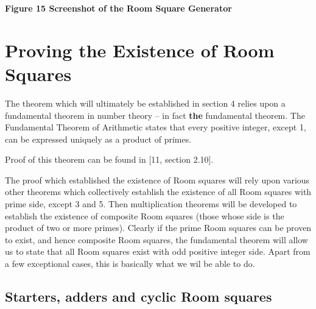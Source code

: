 \documentclass[
  12pt,
  a4paper]{book}
\begin{document}
\textbf{Figure 15 Screenshot of the Room Square Generator}

\hypertarget{proving-the-existence-of-room-squares}{%
\chapter{Proving the Existence of Room
Squares}\label{proving-the-existence-of-room-squares}}

The theorem which will ultimately be established in section 4 relies
upon a fundamental theorem in number theory -- in fact \textbf{the}
fundamental theorem. The Fundamental Theorem of Arithmetic states that
every positive integer, except 1, can be expressed uniquely as a product
of primes.

Proof of this theorem can be found in {[}11, section 2.10{]}.

The proof which established the existence of Room squares will rely upon
various other theorems which collectively establish the existence of all
Room squares with prime side, except 3 and 5. Then multiplication
theorems will be developed to establish the existence of composite Room
squares (those whose side is the product of two or more primes). Clearly
if the prime Room squares can be proven to exist, and hence composite
Room squares, the fundamental theorem will allow us to state that all
Room squares exist with odd positive integer side. Apart from a few
exceptional cases, this is basically what we wil be able to do.

\hypertarget{starters-adders-and-cyclic-room-squares}{%
\section{Starters, adders and cyclic Room
squares}\label{starters-adders-and-cyclic-room-squares}}
\end{document}
